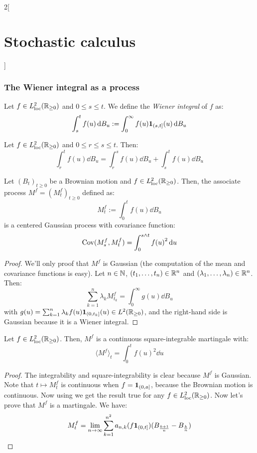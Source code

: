 \documentclass[../../../main_math.tex]{subfiles}
\begin{document}
\begin{multicols}{2}[\section{Stochastic calculus}]
  \subsubsection{The Wiener integral as a process}
  \begin{definition}
    Let $f\in L_{\text{loc}}^2(\mathbb{R}_{\geq 0})$ and $0\leq s\leq t$. We define the \emph{Wiener integral} of $f$ as:
    $$
      \int_s^t f(u)\dd{B_u}:=\int_0^\infty f(u)\boldsymbol{\mathrm{1}}_{(s,t]}(u)\dd{B_u}
    $$
  \end{definition}
  \begin{lemma}
    Let $f\in L_{\text{loc}}^2(\mathbb{R}_{\geq 0})$ and $0\leq r\leq s\leq t$. Then:
    $$
      \int_r^t f(u)\dd{B_u}=\int_r^s f(u)\dd{B_u}+\int_s^t f(u)\dd{B_u}
    $$
  \end{lemma}
  \begin{proposition}
    Let ${(B_t)}_{t\geq 0}$ be a Brownian motion and $f\in L_{\text{loc}}^2(\mathbb{R}_{\geq 0})$. Then, the associate process $M^f={(M_t^f)}_{t\geq 0}$ defined as:
    $$
      M_t^f:=\int_0^t f(u)\dd{B_u}
    $$
    is a centered Gaussian process with covariance function:
    $$
      \mathrm{Cov}(M_s^f,M_t^f)=\int_0^{s\wedge t}{f(u)}^2\dd{u}
    $$
  \end{proposition}
  \begin{proof}
    We'll only proof that $M^f$ is Gaussian (the computation of the mean and covariance functions is easy). Let $n\in\mathbb{N}$, $(t_1,\ldots,t_n)\in\mathbb{R}^n$ and $(\lambda_1,\ldots,\lambda_n)\in\mathbb{R}^n$. Then:
    $$
      \sum_{k=1}^n\lambda_k M_{t_k}^f=\int_0^\infty g(u)\dd{B_u}
    $$
    with $g(u)=\sum_{k=1}^n\lambda_k f(u)\boldsymbol{\mathrm{1}}_{(0,t_k]}(u)\in L^2(\mathbb{R}_{\geq 0})$, and the right-hand side is Gaussian because it is a Wiener integral.
  \end{proof}
  \begin{theorem}
    Let $f\in L_{\text{loc}}^2(\mathbb{R}_{\geq 0})$. Then, $M^f$ is a continuous square-integrable martingale with:
    $$
      {\langle M^f\rangle}_t=\int_0^t{f(u)}^2\dd{u}
    $$
  \end{theorem}
  \begin{proof}
    The integrability and square-integrability is clear because $M^f$ is Gaussian. Note that $t\mapsto M_t^f$ is continuous when $f=\boldsymbol{\mathrm{1}}_{(0,a]}$, because the Brownian motion is continuous. Now using  we get the result true for any $f\in L_{\text{loc}}^2(\mathbb{R}_{\geq 0})$. Now let's prove that $M^f$ is a martingale. We have:
    \begin{align*}
      M_t^f & =\lim_{n\to\infty}\sum_{k=1}^{n^2}a_{n,k}(f\indi{(0,t]})(B_{\frac{k+1}{n}}-B_{\frac{k}{n}})                 \\

\end{align*}
\end{proof}
\end{multicols}
\end{document}
